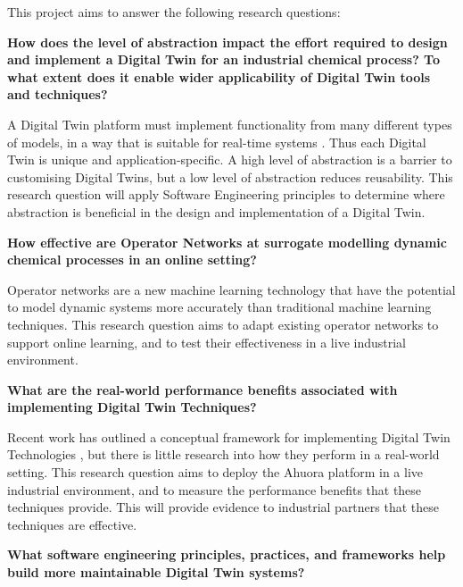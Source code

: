 \documentclass[12pt]{article}
\begin{document}
This project aims to answer the following research questions:

\textbf{How does the level of abstraction impact the effort required to design and implement a Digital Twin for an industrial chemical process? To what extent does it enable wider applicability of Digital Twin tools and techniques?}

A Digital Twin platform must implement functionality from many different types of models, in a way that is suitable for real-time systems \cite{cao2021simulation}. Thus each Digital Twin is unique and application-specific. A high level of abstraction is a barrier to customising Digital Twins, but a low level of abstraction reduces reusability. This research question will apply Software Engineering principles to determine where abstraction is beneficial in the design and implementation of a Digital Twin.


\textbf{How effective are Operator Networks at surrogate modelling dynamic chemical processes in an online setting?} %

Operator networks are a new machine learning technology that have the potential to model dynamic systems more accurately than traditional machine learning techniques. This research question aims to adapt existing operator networks to support online learning, and to test their effectiveness in a live industrial environment. 

\textbf{What are the real-world performance benefits associated with implementing Digital Twin Techniques?}

Recent work has outlined a conceptual framework for implementing Digital Twin Technologies \cite{ors2020conceptual}, but there is little research into how they perform in a real-world setting. This research question aims to deploy the Ahuora platform in a live industrial environment, and to measure the performance benefits that these techniques provide. This will provide evidence to industrial partners that these techniques are effective. 

\textbf{What software engineering principles, practices, and frameworks help build more maintainable Digital Twin systems?}
\end{document}
